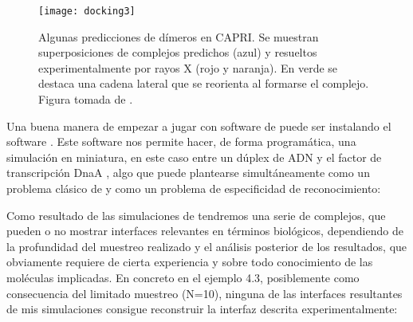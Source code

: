 \begin{figure}
\begin{center} 
\texttt{[image: docking3]}
\caption%
{
Algunas predicciones de d\'{i}meros en CAPRI. 
Se muestran superposiciones de complejos predichos (azul) y resueltos experimentalmente por rayos X (rojo y naranja). 
En verde se destaca una cadena lateral que se reorienta al formarse el complejo. 
Figura tomada de . 
}
\label{fig:docking}
\end{center}
\end{figure} 


Una buena manera de empezar a jugar con software de  puede ser instalando el software 
 \citep{Chaudhury2010}. Este software nos permite hacer,
de forma program\'{a}tica, una simulaci\'{o}n  en miniatura, en este caso entre un d\'{u}plex de ADN y 
el factor de transcripci\'{o}n DnaA , algo que puede plantearse simult\'{a}neamente como un problema cl\'{a}sico 
de  y como un problema de especificidad de reconocimiento:


Como resultado de las simulaciones de  tendremos una serie de complejos, que pueden o no
mostrar interfaces relevantes en t\'{e}rminos biol\'{o}gicos, dependiendo de la profundidad del muestreo realizado
y el an\'{a}lisis posterior de los resultados, que obviamente requiere de cierta experiencia y sobre todo conocimiento
de las mol\'{e}culas implicadas. 
En concreto en el ejemplo 4.3, posiblemente como consecuencia del limitado muestreo (N=10), ninguna de las 
interfaces resultantes de mis simulaciones  consigue
reconstruir la interfaz descrita experimentalmente:

